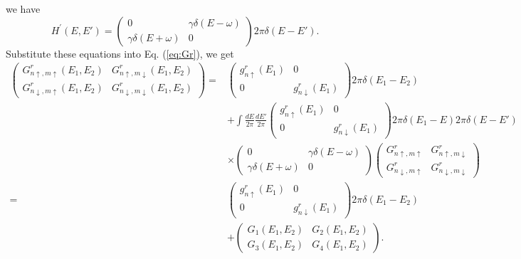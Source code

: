 \documentclass[11pt,a4paper]{article}
\begin{document}
we have
\begin{equation}
H^{\prime}(E, E')=\left(\begin{array}{cc}
0 & \gamma \delta(E-\omega) \\
\gamma \delta(E+\omega) & 0
\end{array}\right) 2\pi\delta(E-E').
\end{equation}
Substitute these equations into Eq. (\ref{eq:Gr}), we get
\begin{equation}
\begin{split}
\left(\begin{array}{cc}
G_{n\uparrow,m\uparrow}^{r}(E_{1},E_{2}) & G_{n\uparrow,m\downarrow}^{r}(E_{1},E_{2}) \\
G_{n\downarrow,m\uparrow}^{r}(E_{1},E_{2}) & G_{n\downarrow,m\downarrow}^{r}(E_{1},E_{2})
\end{array}\right) = &
\left(\begin{array}{cc}
g_{n\uparrow}^{r}(E_{1}) &0 \\
0 & g_{n\downarrow}^{r}(E_{1})
\end{array}\right) 2\pi\delta(E_{1}-E_{2})\\
&+ \int\frac{dE}{2\pi}\frac{dE'}{2\pi}\left(\begin{array}{cc}
g_{n\uparrow}^{r}(E_{1}) &0 \\
0 & g_{n\downarrow}^{r}(E_{1})
\end{array}\right) 2\pi\delta(E_{1}-E)2\pi\delta(E-E')\\
&\times
\left(\begin{array}{cc}
0 & \gamma \delta(E-\omega) \\
\gamma \delta(E+\omega) & 0
\end{array}\right)
 \left(\begin{array}{cc}
G_{n\uparrow,m\uparrow}^{r} & G_{n\uparrow,m\downarrow}^{r} \\
G_{n\downarrow,m\uparrow}^{r} & G_{n\downarrow,m\downarrow}^{r}
\end{array}\right) \\
=&\left(\begin{array}{cc}
g_{n\uparrow}^{r}(E_{1}) &0 \\
0 & g_{n\downarrow}^{r}(E_{1})
\end{array}\right) 2\pi\delta(E_{1}-E_{2})\\
&+ \left(\begin{array}{cc}
G_{1}(E_{1},E_{2}) & G_{2}(E_{1},E_{2}) \\
G_{3}(E_{1},E_{2}) & G_{4}(E_{1},E_{2})
\end{array}\right).
\end{split}
\end{equation}
\end{document}
